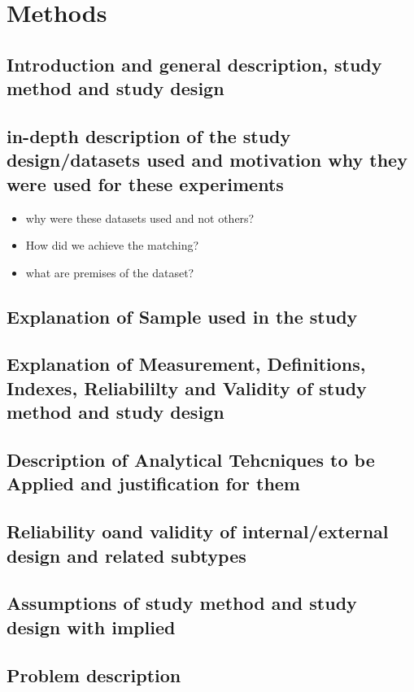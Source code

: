 \documentclass[]{article}
\begin{document}
\section{Methods}
\subsection*{Introduction and general description, study method and study design}

\subsection*{in-depth description of the study design/datasets used and motivation why they were used for these experiments}
\begin{itemize}
	\item why were these datasets used and not others?
	\item How did we achieve the matching?
	\item what are premises of the dataset?
\end{itemize}

\subsection*{Explanation of Sample used in the study}

\subsection*{Explanation of Measurement, Definitions, Indexes, Reliabililty and Validity of study method and study design}

\subsection*{Description of Analytical Tehcniques to be Applied and justification for them}

\subsection*{Reliability oand validity of internal/external design and related subtypes}

\subsection*{Assumptions of study method and study design with implied }

\subsection{Problem description}
\end{document}
